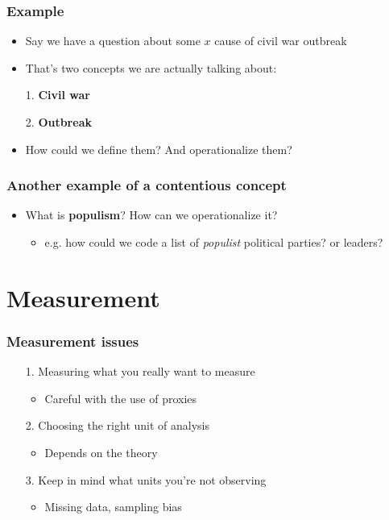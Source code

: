 \documentclass[aspectratio=43]{beamer}
\begin{document}
\begin{frame}
\frametitle{Example}
\centering

\begin{itemize}
  \item Say we have a question about some $x$ cause of civil war outbreak
  \item That's two concepts we are actually talking about:
  \item[1.] \textbf{Civil war}
  \item[2.] \textbf{Outbreak}
  \item How could we define them? And operationalize them?
\end{itemize}

\end{frame}

\begin{frame}
\frametitle{Another example of a contentious concept}
\centering

\begin{itemize}
  \item What is \textbf{populism}? How can we operationalize it?
  \begin{itemize}
    \item e.g. how could we code a list of \textit{populist} political parties? or leaders?
  \end{itemize}
\end{itemize}

\end{frame}

\section{Measurement}

\begin{frame}
\frametitle{Measurement issues}
\centering

\begin{itemize}
  \item[1.] Measuring what you really want to measure
  \begin{itemize}
    \item Careful with the use of proxies
  \end{itemize}
  \item[2.] Choosing the right unit of analysis
  \begin{itemize}
    \item Depends on the theory
  \end{itemize}
  \item[3.] Keep in mind what units you're not observing
  \begin{itemize}
    \item Missing data, sampling bias
  \end{itemize}
\end{itemize}

\end{frame}
\end{document}
